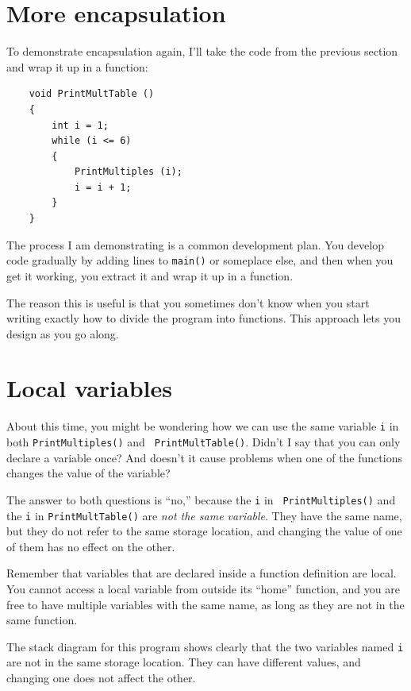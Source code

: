 \section{More encapsulation}

To demonstrate encapsulation again, I'll take the code
from the previous section and wrap it up in a function:

\begin{verbatim}
    void PrintMultTable () 
    {
        int i = 1;
        while (i <= 6) 
        {
            PrintMultiples (i);
            i = i + 1;
        }
    }
\end{verbatim}
%
The process I am demonstrating is a common 
development plan.  You develop code gradually by adding
lines to {\tt main()} or someplace else, and then when you get
it working, you extract it and wrap it up in a function.

The reason this is useful is that you sometimes don't know
when you start writing exactly how to divide the program into
functions.  This approach lets you design as you go along.

\section{Local variables}

About this time, you might be wondering how we can use the same
variable {\tt i} in both {\tt PrintMultiples()} and {\tt
PrintMultTable()}.  Didn't I say that you can only declare a variable
once?  And doesn't it cause problems when one of the functions changes
the value of the variable?

The answer to both questions is ``no,'' because the {\tt i} in {\tt
PrintMultiples()} and the {\tt i} in {\tt PrintMultTable()} are
{\em not the same variable}.  They have the same name, but
they do not refer to the same storage location, and changing
the value of one of them has no effect on the other.


Remember that variables that are declared inside a function definition
are local.  You cannot access a local variable from outside its
``home'' function, and you are free to have multiple variables with
the same name, as long as they are not in the same function.

The stack diagram for this program shows clearly that the
two variables named {\tt i} are not in the same storage location.
They can have different values, and changing one does not affect
the other.


